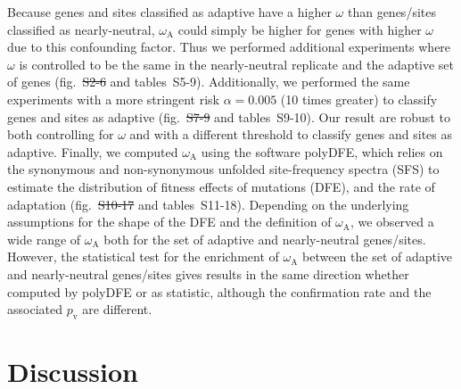 \documentclass{article}
\newcommand{\rateApop}{\omega_{\mathrm{A}}}
\providecommand{\DIFaddtex}[1]{{\protect\color{blue}\uwave{#1}}} %
\providecommand{\DIFdeltex}[1]{{\protect\color{red}\sout{#1}}}                      %
\providecommand{\DIFaddbegin}{} %
\providecommand{\DIFaddend}{} %
\providecommand{\DIFdelbegin}{} %
\providecommand{\DIFdelend}{} %
\providecommand{\DIFadd}[1]{\texorpdfstring{\DIFaddtex{#1}}{#1}} %
\providecommand{\DIFdel}[1]{\texorpdfstring{\DIFdeltex{#1}}{}} %
\newcommand{\DIFscaledelfig}{0.5}
\newlength{\DIFdelgraphicswidth} %
\newlength{\DIFdelgraphicsheight} %
\newcommand{\DIFaddincludegraphics}[2][]{{\color{blue}\fbox{\DIFOincludegraphics[#1]{#2}}}} %
\newcommand{\DIFdelincludegraphics}[2][]{%
\sbox{\DIFdelgraphicsbox}{\DIFOincludegraphics[#1]{#2}}%
\settoboxwidth{\DIFdelgraphicswidth}{\DIFdelgraphicsbox} %
\settoboxtotalheight{\DIFdelgraphicsheight}{\DIFdelgraphicsbox} %
\scalebox{\DIFscaledelfig}{%
\parbox[b]{\DIFdelgraphicswidth}{\usebox{\DIFdelgraphicsbox}\\[-\baselineskip] \rule{\DIFdelgraphicswidth}{0em}}\llap{\resizebox{\DIFdelgraphicswidth}{\DIFdelgraphicsheight}{%
\setlength{\unitlength}{\DIFdelgraphicswidth}%
\begin{picture}(1,1)%
\thicklines\linethickness{2pt} %
{\color[rgb]{1,0,0}\put(0,0){\framebox(1,1){}}}%
{\color[rgb]{1,0,0}\put(0,0){\line( 1,1){1}}}%
{\color[rgb]{1,0,0}\put(0,1){\line(1,-1){1}}}%
\end{picture}%
}\hspace*{3pt}}} %
} %
\DeclareRobustCommand{\DIFaddbegin}{\DIFOaddbegin \let\includegraphics\DIFaddincludegraphics} %
\DeclareRobustCommand{\DIFaddend}{\DIFOaddend \let\includegraphics\DIFOincludegraphics} %
\DeclareRobustCommand{\DIFdelbegin}{\DIFOdelbegin \let\includegraphics\DIFdelincludegraphics} %
\DeclareRobustCommand{\DIFdelend}{\DIFOaddend \let\includegraphics\DIFOincludegraphics} %
\begin{document}
    Because genes and sites classified as adaptive have a higher $\omega$ than genes/sites classified as nearly-neutral, $\rateApop$ could simply be higher for genes with higher $\omega$ due to this confounding factor.
    Thus we performed additional experiments where $\omega$ is controlled to be the same in the nearly-neutral replicate and the adaptive set of genes (fig.~\DIFdelbegin \DIFdel{S2-6 }\DIFdelend \DIFaddbegin \DIFadd{S3-7 }\DIFaddend and tables~S5-9).
    Additionally, we performed the same experiments with a more stringent risk $\alpha=0.005$ (10 times greater) to classify genes and sites as adaptive (fig.~\DIFdelbegin \DIFdel{S7-9 }\DIFdelend \DIFaddbegin \DIFadd{S8-10 }\DIFaddend and tables~S9-10).
    Our result are robust to both controlling for $\omega$ and with a different threshold to classify genes and sites as adaptive.
    Finally, we computed $\rateApop$ using the software polyDFE\cite{tataru_polydfe_2020}, which relies on the synonymous and non-synonymous unfolded site-frequency spectra (SFS) to estimate the distribution of fitness effects of mutations (DFE), and the rate of adaptation (fig.~\DIFdelbegin \DIFdel{S10-17 }\DIFdelend \DIFaddbegin \DIFadd{S11-18 }\DIFaddend and tables~S11-18).
    Depending on the underlying assumptions for the shape of the DFE and the definition of $\rateApop$, we observed a wide range of $\rateApop$ both for the set of adaptive and nearly-neutral genes/sites.
    However, the statistical test for the enrichment of $\rateApop$ between the set of adaptive and nearly-neutral genes/sites gives results in the same direction whether computed by polyDFE or as \textcite{mcdonald_adaptative_1991} statistic, although the confirmation rate and the associated $p_{\mathrm{v}}$ are different.

    \section*{Discussion}\label{sec:discussion}
\end{document}
